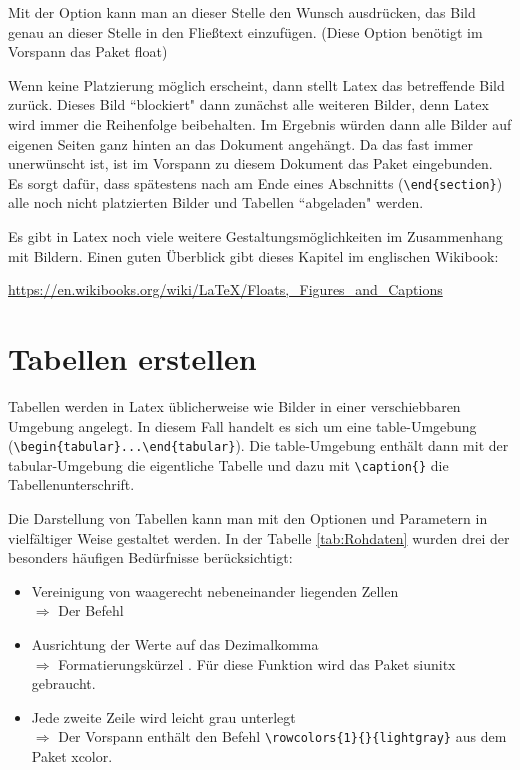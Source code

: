 \documentclass[ngerman]{scrartcl}
\begin{document}
Mit der Option \code{[H]} kann man an dieser Stelle den Wunsch ausdrücken, das Bild genau an dieser Stelle in den Fließtext einzufügen. (Diese Option benötigt im Vorspann das Paket float)

Wenn keine Platzierung möglich erscheint, dann stellt Latex das betreffende Bild zurück. Dieses Bild ``blockiert" dann zunächst alle weiteren Bilder, denn Latex wird immer die Reihenfolge beibehalten. Im Ergebnis würden dann alle Bilder auf eigenen Seiten ganz hinten an das Dokument angehängt. Da das fast immer unerwünscht ist, ist im Vorspann zu diesem Dokument das Paket  eingebunden. Es sorgt dafür, dass spätestens nach am Ende eines Abschnitts (\verb|\end{section}|) alle noch nicht platzierten Bilder und Tabellen ``abgeladen" werden.

Es gibt in Latex noch viele weitere Gestaltungsmöglichkeiten im Zusammenhang mit Bildern. Einen guten Überblick gibt dieses Kapitel im englischen Wikibook:
\begin{center}
	\url{https://en.wikibooks.org/wiki/LaTeX/Floats,_Figures_and_Captions}
\end{center}

\section{Tabellen erstellen}
Tabellen werden in Latex üblicherweise wie Bilder in einer verschiebbaren Umgebung angelegt. In diesem Fall handelt es sich um eine table-Umgebung (\verb|\begin{tabular}...\end{tabular}|). Die table-Umgebung enthält dann mit der tabular-Umgebung die eigentliche Tabelle und dazu mit \verb|\caption{}| die Tabellenunterschrift.

Die Darstellung von Tabellen kann man mit den Optionen und Parametern in vielfältiger Weise gestaltet werden. In der Tabelle \ref{tab:Rohdaten} wurden drei der besonders häufigen Bedürfnisse berücksichtigt:
\begin{itemize}
	\item Vereinigung von waagerecht nebeneinander liegenden Zellen\\
		$\Rightarrow$ Der Befehl 
	\item Ausrichtung der Werte auf das Dezimalkomma\\
		$\Rightarrow$ Formatierungskürzel . Für diese Funktion wird das Paket siunitx gebraucht.
	\item Jede zweite Zeile wird leicht grau unterlegt\\
		$\Rightarrow$ Der Vorspann enthält den Befehl \verb|\rowcolors{1}{}{lightgray}| aus dem Paket xcolor.
\end{itemize}
\end{document}
